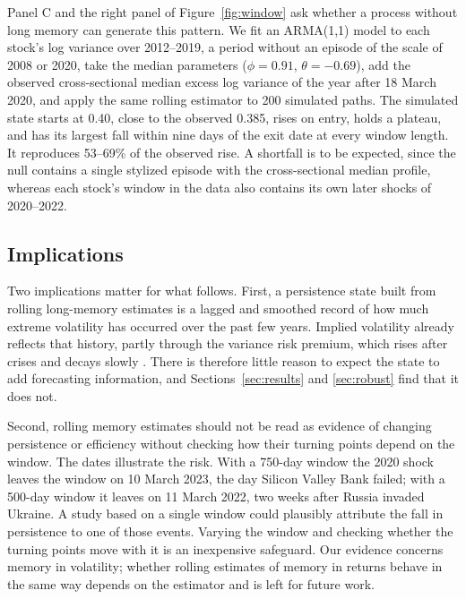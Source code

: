 Panel C and the right panel of Figure~\ref{fig:window} ask whether a process
without long memory can generate this pattern. We fit an ARMA(1,1) model to
each stock's log variance over 2012--2019, a period without an episode of
the scale of 2008 or 2020, take the median parameters ($\phi=0.91$,
$\theta=-0.69$), add the observed cross-sectional median excess log variance
of the year after 18 March 2020, and apply the same rolling estimator to 200
simulated paths. The simulated state starts at 0.40, close to the observed
0.385, rises on entry, holds a plateau, and has its largest fall within nine
days of the exit date at every window length. It reproduces 53--69\% of the
observed rise. A shortfall is to be expected, since the null contains a
single stylized episode with the cross-sectional median profile, whereas each
stock's window in the data also contains its own later shocks of 2020--2022.

\subsection{Implications}

Two implications matter for what follows. First, a persistence state built
from rolling long-memory estimates is a lagged and smoothed record of how
much extreme volatility has occurred over the past few years. Implied
volatility already reflects that history, partly through the variance risk
premium, which rises after crises and decays slowly \citep{bates2000post,
andersen2015risk}. There is therefore little reason to expect the state to
add forecasting information, and Sections~\ref{sec:results} and
\ref{sec:robust} find that it does not.

Second, rolling memory estimates should not be read as evidence of changing
persistence or efficiency without checking how their turning points depend on
the window. The dates illustrate the risk. With a 750-day window the 2020
shock leaves the window on 10 March 2023, the day Silicon Valley Bank
failed; with a 500-day window it leaves on 11 March 2022, two weeks after
Russia invaded Ukraine. A study based on a single window could plausibly
attribute the fall in persistence to one of those events. Varying the window
and checking whether the turning points move with it is an inexpensive
safeguard. Our evidence concerns memory in volatility; whether rolling
estimates of memory in returns behave in the same way depends on the
estimator and is left for future work.
